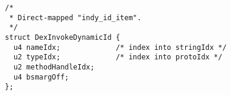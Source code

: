 {\tiny \begin{verbatim}
  /*
   * Direct-mapped "indy_id_item".
   */
  struct DexInvokeDynamicId {
    u4 nameIdx;             /* index into stringIdx */
    u2 typeIdx;             /* index into protoIdx */
    u2 methodHandleIdx;
    u4 bsmargOff;
  };
\end{verbatim} }